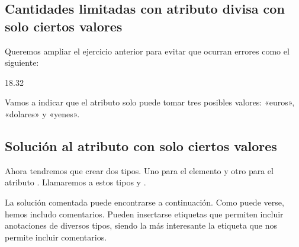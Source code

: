 \documentclass[letterpaper,10pt,spanish]{sphinxmanual}
\begin{document}
\subsection{Cantidades limitadas con atributo divisa con solo ciertos valores}
\label{\detokenize{tema5:cantidades-limitadas-con-atributo-divisa-con-solo-ciertos-valores}}
Queremos ampliar el ejercicio anterior para evitar que ocurran errores como el siguiente:

\begin{sphinxVerbatim}[commandchars=\\\{\}]
 18.32
\end{sphinxVerbatim}

Vamos a indicar que el atributo solo puede tomar tres posibles valores: «euros», «dolares» y «yenes».


\subsection{Solución al atributo con solo ciertos valores}
\label{\detokenize{tema5:solucion-al-atributo-con-solo-ciertos-valores}}
Ahora tendremos que crear dos tipos. Uno para el elemento  y otro para el atributo . Llamaremos a estos tipos  y .

La solución comentada puede encontrarse a continuación. Como puede verse, hemos includo comentarios. Pueden insertarse etiquetas  que permiten incluir anotaciones de diversos tipos, siendo la más interesante la etiqueta  que nos permite incluir comentarios.
\end{document}
